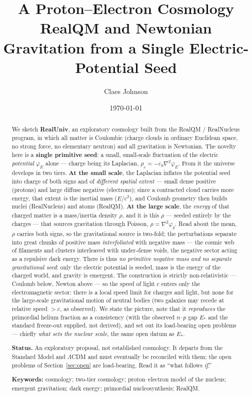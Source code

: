 \documentclass[11pt]{article}
\title{\textbf{A Proton--Electron Cosmology}\\[0.25em]
\large RealQM and Newtonian Gravitation from a Single Electric-Potential Seed}
\author[1]{Claes Johnson}
\affil[1]{KTH Royal Institute of Technology, Stockholm, Sweden \\ \texttt{claesjohnson@gmail.com}}
\date{\today}
\newcommand{\grad}{\nabla}
\begin{document}
\maketitle

\begin{abstract}
We sketch \textbf{RealUniv}, an exploratory cosmology built from the RealQM / RealNucleus program, in which all matter is Coulombic
(charge clouds in ordinary Euclidean space, no strong force, no elementary neutron) and all gravitation is
Newtonian. The novelty here is a \textbf{single primitive seed}: a small, small-scale fluctuation of the electric
\emph{potential} $\varphi_E$ alone --- charge being its Laplacian, $\rho_c=-\varepsilon_0\grad^2\varphi_E$. From it
the universe develops in two tiers. \textbf{At the small scale}, the Laplacian inflates the potential seed into
charge of both signs and of \emph{different spatial extent} --- small dense positive (protons) and large diffuse negative
(electrons); since a contracted cloud carries more energy, that extent \emph{is} the inertial mass ($E/c^2$), and
Coulomb geometry then builds nuclei (RealNucleus) and atoms (RealQM). \textbf{At the large scale}, the
\emph{energy} of that charged matter is a mass/inertia density $\rho$, and it is this $\rho$ --- seeded entirely by
the charges --- that sources gravitation through Poisson, $\rho=\grad^2\varphi_g$. Read about the mean, $\rho$
carries both signs, so the gravitational source is two-fold; the perturbations separate into great chunks of
positive mass \emph{interfoliated} with negative mass --- the cosmic web of filaments and clusters interleaved with
under-dense voids, the negative sector acting as a repulsive dark energy. There is thus \emph{no primitive negative
mass and no separate gravitational seed}: only the electric potential is seeded, mass is the energy of the charged world, and
gravity is emergent. The construction is strictly non-relativistic --- Coulomb below, Newton above --- so the speed
of light $c$ enters only the electromagnetic sector: there is a local speed limit for charges and light, but none
for the large-scale gravitational motion of neutral bodies (two galaxies may recede at relative speed $>c$, as
observed). We
state the picture, note that it \emph{reproduces} the primordial helium fraction as a consistency (with the
observed $n$--$p$ gap $E_\ast$ and the standard freeze-out supplied, not derived), and set out its load-bearing
open problems --- chiefly \emph{what sets the nuclear scale}, the same open datum as $E_\ast$.

\medskip
\noindent\textbf{Status.} An exploratory proposal, not established cosmology. It departs from the Standard Model and
$\Lambda$CDM and must eventually be reconciled with them; the open problems of Section~\ref{sec:open} are
load-bearing. Read it as ``what follows \emph{if}.''

\medskip
\noindent\textbf{Keywords:} cosmology; two-tier cosmology; proton--electron model of the nucleus; emergent
gravitation; dark energy; primordial nucleosynthesis; RealQM.
\end{abstract}
\end{document}
